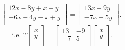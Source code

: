 \documentclass{report}
\begin{document}
{\[\begin{bmatrix}
	   12x-8y+x-y\\
	   -6x +4y -x +y\\
	   \end{bmatrix}
	   = \begin{bmatrix}
	   13x -9y\\
	   -7x +5y\\
	   \end{bmatrix}
	   .\] 
	   \[
	   \text{ i.e. } T \begin{bmatrix}
	   x\\
	   y\\
	   \end{bmatrix}
	   = \begin{bmatrix}
	   13 &  -9\\
	   -7 & 5\\
	   \end{bmatrix} \begin{bmatrix}
	   x\\
	   y\\
	   \end{bmatrix}
	   .\] 
   }
\end{document}
